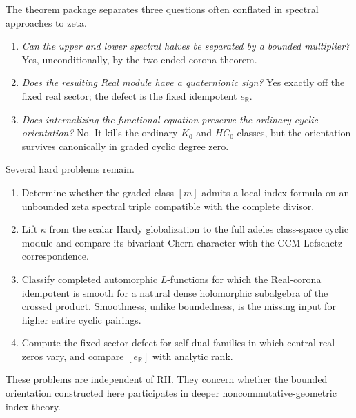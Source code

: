\documentclass[11pt]{article}
\theoremstyle{definition}
\theoremstyle{remark}
\newcommand{\R}{\mathbb R}
\begin{document}
The theorem package separates three questions often conflated in spectral
approaches to zeta.

\begin{enumerate}
\item \emph{Can the upper and lower spectral halves be separated by a bounded
multiplier?}  Yes, unconditionally, by the two-ended corona theorem.
\item \emph{Does the resulting Real module have a quaternionic sign?}  Yes
exactly off the fixed real sector; the defect is the fixed idempotent
$e_{\R}$.
\item \emph{Does internalizing the functional equation preserve the ordinary
cyclic orientation?}  No.  It kills the ordinary $K_0$ and $HC_0$ classes, but
the orientation survives canonically in graded cyclic degree zero.
\end{enumerate}

Several hard problems remain.

\begin{enumerate}[label=\textup{(P\arabic*)}]
\item Determine whether the graded class $[m]$ admits a local index formula on
      an unbounded zeta spectral triple compatible with the complete divisor.
\item Lift $\kappa$ from the scalar Hardy globalization to the full adeles
      class-space cyclic module and compare its bivariant Chern character with
      the CCM Lefschetz correspondence.
\item Classify completed automorphic $L$-functions for which the Real-corona
      idempotent is smooth for a natural dense holomorphic subalgebra of the
      crossed product.  Smoothness, unlike boundedness, is the missing input
      for higher entire cyclic pairings.
\item Compute the fixed-sector defect for self-dual families in which central
      real zeros vary, and compare $[e_{\R}]$ with analytic rank.
\end{enumerate}

These problems are independent of RH.  They concern whether the bounded
orientation constructed here participates in deeper noncommutative-geometric
index theory.
\end{document}
